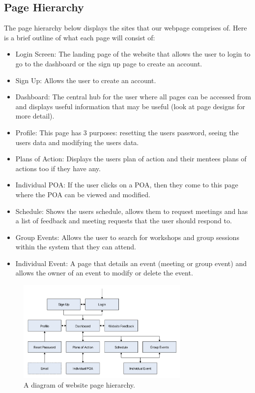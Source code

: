 \documentclass[10pt]{article}
\begin{document}
\subsection{Page Hierarchy}
The page hierarchy below displays the sites that our webpage comprises of. Here
is a brief outline of what each page will consist of:
\begin{itemize}
    \item Login Screen: The landing page of the website that allows the user to
    login to go to the dashboard or the sign up page to create an account.
    \item Sign Up: Allows the user to create an account.
    \item Dashboard: The central hub for the user where all pages can be
    accessed from and displays useful information that may be useful (look at
    page designs for more detail).
    \item Profile: This page has 3 purposes: resetting the users password,
    seeing the users data and modifying the users data.
    \item Plans of Action: Displays the users plan of action and their mentees
    plans of actions too if they have any.
    \item Individual POA: If the user clicks on a POA, then they come to this
    page where the POA can be viewed and modified.
    \item Schedule: Shows the users schedule, allows them to request meetings
    and has a list of feedback and meeting requests that the user should respond
    to.
    \item Group Events: Allows the user to search for workshops and group
    sessions within the system that they can attend.
    \item Individual Event: A page that details an event (meeting or group
    event) and allows the owner of an event to modify or delete the event.
\end{itemize}

\begin{figure}[H]
    \centering
    \includegraphics[width=0.75\textwidth]{Hierarchy}
    \caption{A diagram of website page hierarchy.}
    \label{fig:website_page_hierarchy}
\end{figure}
\end{document}
